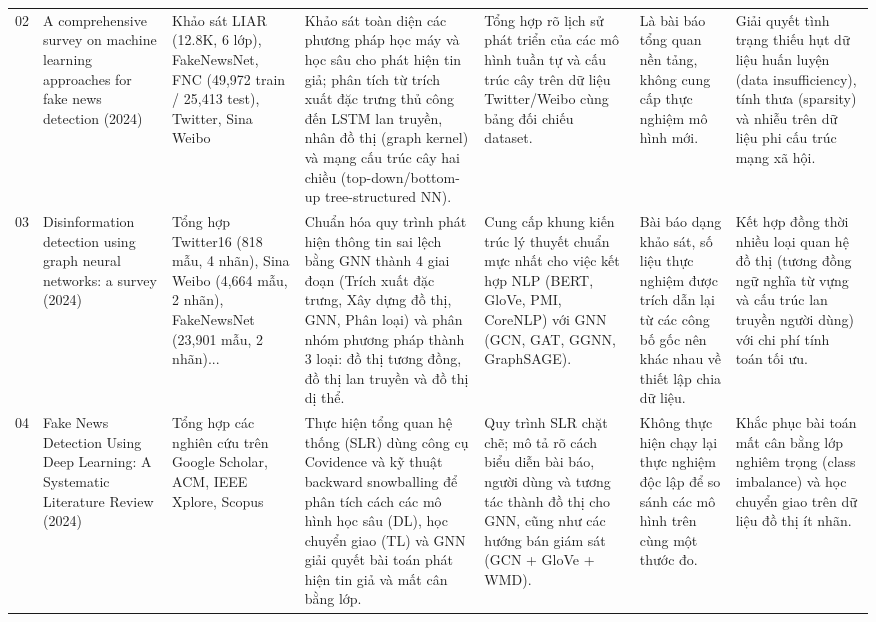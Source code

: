 \documentclass[11pt,a4paper]{extreport}
\begin{document}
\begin{landscape}
\begin{longtable}{@{}C{0.6cm}p{3.6cm}p{2.7cm}p{4.8cm}p{3.6cm}p{3.6cm}p{3.6cm}@{}}
02 & A comprehensive survey on machine learning approaches for fake news detection (2024) \cite{noauthor_comprehensive_2024} & Khảo sát LIAR (12.8K, 6 lớp), FakeNewsNet, FNC (49,972 train / 25,413 test), Twitter, Sina Weibo & Khảo sát toàn diện các phương pháp học máy và học sâu cho phát hiện tin giả; phân tích từ trích xuất đặc trưng thủ công đến LSTM lan truyền, nhân đồ thị (graph kernel) và mạng cấu trúc cây hai chiều (top-down/bottom-up tree-structured NN). & Tổng hợp rõ lịch sử phát triển của các mô hình tuần tự và cấu trúc cây trên dữ liệu Twitter/Weibo cùng bảng đối chiếu dataset. & Là bài báo tổng quan nền tảng, không cung cấp thực nghiệm mô hình mới. & Giải quyết tình trạng thiếu hụt dữ liệu huấn luyện (data insufficiency), tính thưa (sparsity) và nhiễu trên dữ liệu phi cấu trúc mạng xã hội. \\ 

03 & Disinformation detection using graph neural networks: a survey (2024) \cite{noauthor_disinformation_2024} & Tổng hợp Twitter16 (818 mẫu, 4 nhãn), Sina Weibo (4,664 mẫu, 2 nhãn), FakeNewsNet (23,901 mẫu, 2 nhãn)... & Chuẩn hóa quy trình phát hiện thông tin sai lệch bằng GNN thành 4 giai đoạn (Trích xuất đặc trưng, Xây dựng đồ thị, GNN, Phân loại) và phân nhóm phương pháp thành 3 loại: đồ thị tương đồng, đồ thị lan truyền và đồ thị dị thể. & Cung cấp khung kiến trúc lý thuyết chuẩn mực nhất cho việc kết hợp NLP (BERT, GloVe, PMI, CoreNLP) với GNN (GCN, GAT, GGNN, GraphSAGE). & Bài báo dạng khảo sát, số liệu thực nghiệm được trích dẫn lại từ các công bố gốc nên khác nhau về thiết lập chia dữ liệu. & Kết hợp đồng thời nhiều loại quan hệ đồ thị (tương đồng ngữ nghĩa từ vựng và cấu trúc lan truyền người dùng) với chi phí tính toán tối ưu. \\ 

04 & Fake News Detection Using Deep Learning: A Systematic Literature Review (2024) \cite{noauthor_fake_2024} & Tổng hợp các nghiên cứu trên Google Scholar, ACM, IEEE Xplore, Scopus & Thực hiện tổng quan hệ thống (SLR) dùng công cụ Covidence và kỹ thuật backward snowballing để phân tích cách các mô hình học sâu (DL), học chuyển giao (TL) và GNN giải quyết bài toán phát hiện tin giả và mất cân bằng lớp. & Quy trình SLR chặt chẽ; mô tả rõ cách biểu diễn bài báo, người dùng và tương tác thành đồ thị cho GNN, cũng như các hướng bán giám sát (GCN + GloVe + WMD). & Không thực hiện chạy lại thực nghiệm độc lập để so sánh các mô hình trên cùng một thước đo. & Khắc phục bài toán mất cân bằng lớp nghiêm trọng (class imbalance) và học chuyển giao trên dữ liệu đồ thị ít nhãn. \\ 


\end{longtable}
\end{landscape}
\end{document}
